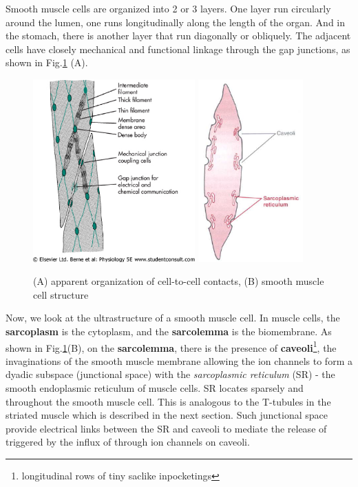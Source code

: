 Smooth muscle cells are organized into 2 or 3 layers. One layer run
circularly around the lumen, one runs longitudinally along the length
of the organ. And in the stomach, there is another layer that run
diagonally or obliquely. The adjacent cells have closely mechanical
and functional linkage through the gap junctions, as shown in
Fig.\ref{fig:SMC_linkage} (A). 

\begin{figure}[htb]
  \centerline{\includegraphics[height=7cm]{./images/muscle_cell_linkage.eps}
\includegraphics[height=7cm]{./images/Caveolae_SMC.eps}}
\caption{(A) apparent organization of cell-to-cell contacts, (B)
  smooth muscle cell structure}\label{fig:SMC_linkage}
\end{figure}


Now, we look at the ultrastructure of a smooth muscle cell.  In muscle
cells, the {\bf sarcoplasm} is the cytoplasm, and the {\bf sarcolemma}
is the biomembrane.  As shown in Fig.\ref{fig:SMC_linkage}(B), on the
{\bf sarcolemma}, there is the presence of
{\bf
  caveoli}\footnote{longitudinal
  rows of tiny saclike inpocketings},
the invaginations of the smooth muscle membrane allowing the ion
channels to form a dyadic subspace (junctional space) with the
{\it sarcoplasmic reticulum} (SR) - the smooth endoplasmic reticulum
of muscle cells. SR locates sparsely and throughout the smooth muscle
cell. This is analogous to the T-tubules in the striated muscle which
is described in the next section.  Such junctional space provide
electrical links between the SR and caveoli to mediate the release of
 triggered by the influx of  through ion channels
on caveoli.


